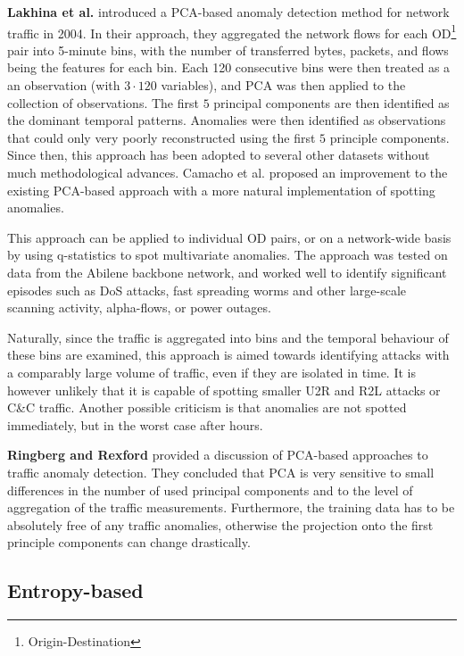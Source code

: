 \documentclass[a4paper,12pt,twoside]{report}
\begin{document}
\textbf{Lakhina et al.} \cite{lakhina_diagnosing_2004,lakhina_characterization_2004}  introduced a PCA-based anomaly detection method for network traffic in 2004. In their approach, they aggregated the network flows for each OD\footnote{Origin-Destination} pair into 5-minute bins, with the number of transferred bytes, packets, and flows being the features for each bin. Each 120 consecutive bins were then treated as a an observation (with $3\cdot 120$ variables), and PCA was then applied to the collection of observations. The first $5$ principal components are then identified as the dominant temporal patterns. Anomalies were then identified as observations that could only very poorly reconstructed using the first $5$ principle components. Since then, this approach has been adopted to several other datasets without much methodological advances. Camacho et al. \cite{camacho_pca-based_2016} proposed an improvement to the existing PCA-based approach with a more natural implementation of spotting anomalies. 

This approach can be applied to individual OD pairs, or on a network-wide basis by using q-statistics to spot multivariate anomalies. The approach was tested on data from the Abilene backbone network, and worked well to identify significant episodes such as DoS attacks, fast spreading worms and other large-scale scanning activity, alpha-flows, or power outages. 

Naturally, since the traffic is aggregated into bins and the temporal behaviour of these bins are examined, this approach is aimed towards identifying attacks with a comparably large volume of traffic, even if they are isolated in time. It is however unlikely that it is capable of spotting smaller U2R and R2L attacks or C\&C traffic. Another possible criticism is that anomalies are not spotted immediately, but in the worst case after hours.


\textbf{Ringberg and Rexford} \cite{ringberg_sensitivity_2007} provided a discussion of PCA-based approaches to traffic anomaly detection. They concluded that PCA is very sensitive to small differences in the number of used principal components and to the level of aggregation of the traffic measurements. Furthermore, the training data has to be absolutely free of any traffic anomalies, otherwise the projection onto the first principle components can change drastically. 

\subsection{Entropy-based}
\end{document}
